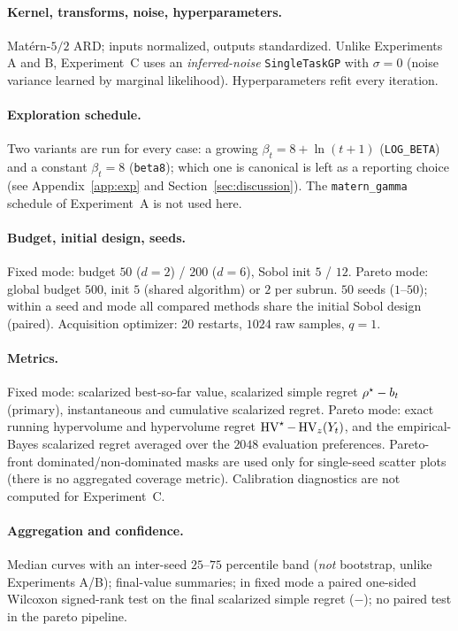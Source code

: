 \paragraph{Kernel, transforms, noise, hyperparameters.}
Mat\'ern-$5/2$ ARD; inputs normalized, outputs standardized. Unlike Experiments A
and B, Experiment~C uses an \emph{inferred-noise} \texttt{SingleTaskGP} with
$\sigma=0$ (noise variance learned by marginal likelihood). Hyperparameters refit
every iteration.

\paragraph{Exploration schedule.}
Two variants are run for every case: a growing $\beta_t=8+\ln(t+1)$
(\texttt{LOG\_BETA}) and a constant $\beta_t=8$ (\texttt{beta8}); which one is
canonical is left as a reporting choice (see Appendix~\ref{app:exp} and
Section~\ref{sec:discussion}). The \texttt{matern\_gamma} schedule of
Experiment~A is not used here.

\paragraph{Budget, initial design, seeds.}
Fixed mode: budget $50$ ($d{=}2$) / $200$ ($d{=}6$), Sobol init $5$ / $12$. Pareto
mode: global budget $500$, init $5$ (shared algorithm) or $2$ per subrun. $50$
seeds ($1$--$50$); within a seed and mode all compared methods share the initial
Sobol design (paired). Acquisition optimizer: $20$ restarts, $1024$ raw samples,
$q=1$.

\paragraph{Metrics.}
Fixed mode: scalarized best-so-far value, scalarized simple regret
$\rho^\star-b_t$ (primary), instantaneous and cumulative scalarized regret. Pareto
mode: exact running hypervolume and hypervolume regret $\operatorname{HV}^\star-\operatorname{HV}_z(Y_t)$, and
the empirical-Bayes scalarized regret averaged over the $2048$ evaluation
preferences. Pareto-front dominated/non-dominated masks are used only for
single-seed scatter plots (there is no aggregated coverage metric). Calibration
diagnostics are not computed for Experiment~C.

\paragraph{Aggregation and confidence.}
Median curves with an inter-seed $25$--$75$ percentile band (\emph{not} bootstrap,
unlike Experiments A/B); final-value summaries; in fixed mode a paired one-sided
Wilcoxon signed-rank test on the final scalarized simple regret
(\WRONG{}$-$\RIGHT); no paired test in the pareto pipeline.

